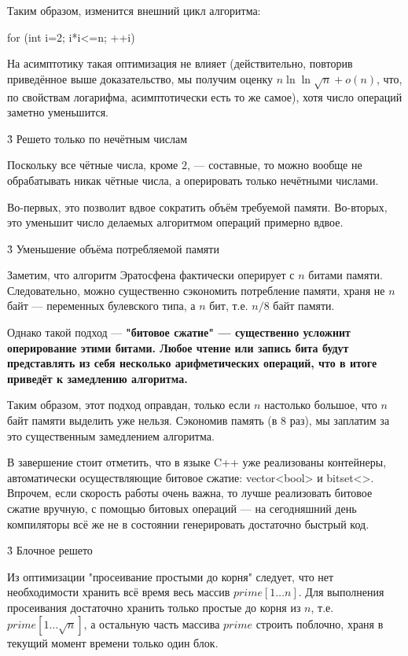 Таким образом, изменится внешний цикл алгоритма:

\code
for (int i=2; i*i<=n; ++i)
\endcode

На асимптотику такая оптимизация не влияет (действительно, повторив приведённое выше доказательство, мы получим оценку $n \ln \ln \sqrt{n} + o(n)$, что, по свойствам логарифма, асимптотически есть то же самое), хотя число операций заметно уменьшится.


\h3{ Решето только по нечётным числам }

Поскольку все чётные числа, кроме $2$, --- составные, то можно вообще не обрабатывать никак чётные числа, а оперировать только нечётными числами.

Во-первых, это позволит вдвое сократить объём требуемой памяти. Во-вторых, это уменьшит число делаемых алгоритмом операций примерно вдвое.


\h3{ Уменьшение объёма потребляемой памяти }

Заметим, что алгоритм Эратосфена фактически оперирует с $n$ битами памяти. Следовательно, можно существенно сэкономить потребление памяти, храня не $n$ байт --- переменных булевского типа, а $n$ бит, т.е. $n/8$ байт памяти.

Однако такой подход --- \bf{"битовое сжатие"} --- существенно усложнит оперирование этими битами. Любое чтение или запись бита будут представлять из себя несколько арифметических операций, что в итоге приведёт к замедлению алгоритма.

Таким образом, этот подход оправдан, только если $n$ настолько большое, что $n$ байт памяти выделить уже нельзя. Сэкономив память (в $8$ раз), мы заплатим за это существенным замедлением алгоритма.

В завершение стоит отметить, что в языке C++ уже реализованы контейнеры, автоматически осуществляющие битовое сжатие: vector<bool> и bitset<>. Впрочем, если скорость работы очень важна, то лучше реализовать битовое сжатие вручную, с помощью битовых операций --- на сегодняшний день компиляторы всё же не в состоянии генерировать достаточно быстрый код.


\h3{ Блочное решето }

Из оптимизации "просеивание простыми до корня" следует, что нет необходимости хранить всё время весь массив $prime[1 \ldots n]$. Для выполнения просеивания достаточно хранить только простые до корня из $n$, т.е. $prime[1 \ldots \sqrt{n}]$, а остальную часть массива $prime$ строить поблочно, храня в текущий момент времени только один блок.

